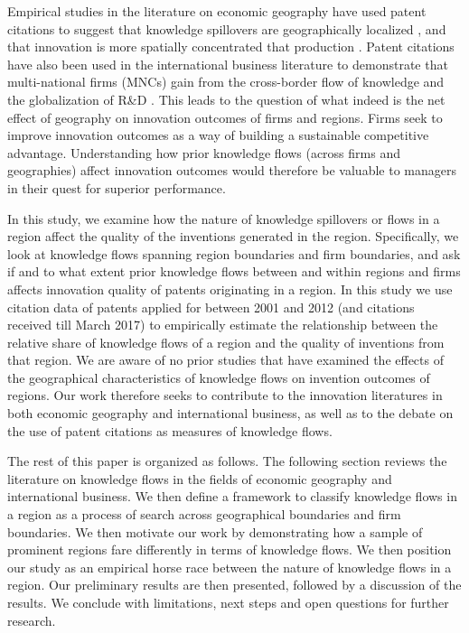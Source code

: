 \documentclass[12pt,letterpaper]{article}
\begin{document}
\noindent Empirical studies in the literature on economic geography have used patent citations to suggest that knowledge spillovers are geographically localized \citep*{Jaffe1993, Almeida1999, Branstetter2001, Sonn2008}, and that innovation is more spatially concentrated that production \citep{Feldman1994a}. Patent citations have also been used in the international business literature to demonstrate that multi-national firms (MNCs) gain from the cross-border flow of knowledge and the globalization of R\&D \citep{Singh2007, Zhao2006, Singh2013}. This leads to the question of what indeed is the net effect of geography on innovation outcomes of firms and regions. Firms seek to improve innovation outcomes as a way of building a sustainable competitive advantage. Understanding how prior knowledge flows (across firms and geographies) affect innovation outcomes would therefore be valuable to managers in their quest for superior performance. \par

In this study, we examine how the nature of knowledge spillovers or flows in a region affect the quality of the inventions generated in the region. Specifically, we look at knowledge flows spanning region boundaries and firm boundaries, and ask if and to what extent prior knowledge flows between and within regions and firms affects innovation quality of patents originating in a region. In this study we use citation data of patents applied for between 2001 and 2012 (and citations received till March 2017) to empirically estimate the relationship between the relative share of knowledge flows of a region and the quality of inventions from that region. We are aware of no prior studies that have examined the effects of the geographical characteristics of knowledge flows on invention outcomes of regions. Our work therefore seeks to contribute to the innovation literatures in both economic geography and international business, as well as to the debate on the use of patent citations as measures of knowledge flows. \par 

The rest of this paper is organized as follows. The following section reviews the literature on knowledge flows in the fields of economic geography and international business. We then define a framework to classify knowledge flows in a region as a process of search across geographical boundaries and firm boundaries. We then motivate our work by demonstrating how a sample of prominent regions fare differently in terms of knowledge flows. We then position our study as an empirical horse race between the nature of knowledge flows in a region. Our preliminary results are then presented, followed by a discussion of the results. We conclude with limitations, next steps and open questions for further research.
\end{document}
